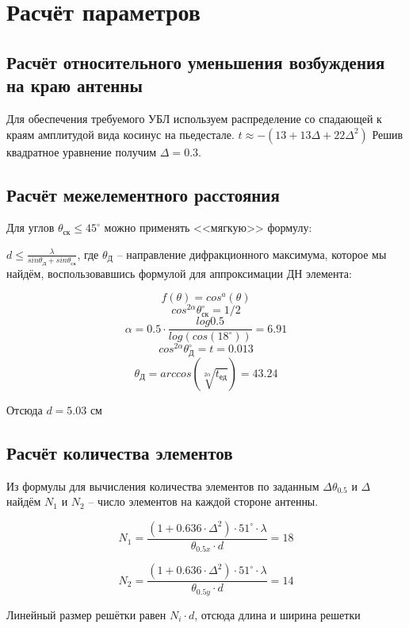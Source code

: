 \chapter{Расчёт параметров}

\section{Расчёт относительного уменьшения возбуждения на краю антенны}

Для обеспечения требуемого УБЛ используем распределение со спадающей к краям амплитудой вида косинус на пьедестале.
$t\approx-(13+13\Delta+22\Delta^2)$
Решив квадратное уравнение получим $\Delta=0.3$.
\section{Расчёт межелементного расстояния}
Для углов $\theta_\text{ск}\leq45^\circ$ можно применять <<мягкую>>  формулу:

$\displaystyle d\leq\frac{\lambda}{sin\theta_\text{Д}+sin\theta_\text{ск}}$, где $\theta_\text{Д}$ -- направление дифракционного максимума, которое мы найдём, воспользовавшись формулой для аппроксимации ДН элемента: \par\noindent
\begin{fleqn}
\[f(\theta)=cos^a(\theta)                                     \]
\[cos^{2\alpha}\theta^{\circ}_{\text{ск}}=1/2                 \]
\[\alpha=0.5\cdot\frac{log0.5}{log(cos(18^\circ))}=6.91       \]
\[cos^{2\alpha}\theta^{\circ}_{\text{Д}}=t=0.013              \]
\[\theta_\text{Д}=arccos(\sqrt[2\alpha]{t_\text{ед}})=43.24   \]
\end{fleqn}


Отсюда $d=5.03 \text{ см}$


\section{Расчёт количества элементов}

Из формулы для вычисления количества элементов по заданным $\Delta\theta_{0.5}$ и $\Delta$ найдём $N_1$ и $N_2$ -- число элементов на каждой стороне антенны.

\[N_1=\frac{(1+0.636\cdot\Delta^2)\cdot51^\circ\cdot\lambda}{\theta_{0.5x}\cdot d}=18\]

\[N_2=\frac{(1+0.636\cdot\Delta^2)\cdot51^\circ\cdot\lambda}{\theta_{0.5y}\cdot d}=14\] 

Линейный размер решётки равен $N_i\cdot d$, отсюда длина и ширина решетки 

